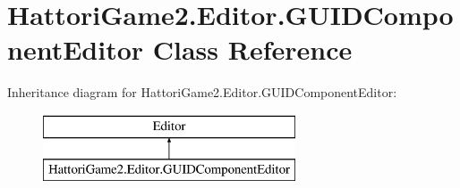 \hypertarget{class_hattori_game2_1_1_editor_1_1_g_u_i_d_component_editor}{}\section{Hattori\+Game2.\+Editor.\+G\+U\+I\+D\+Component\+Editor Class Reference}
\label{class_hattori_game2_1_1_editor_1_1_g_u_i_d_component_editor}
Inheritance diagram for Hattori\+Game2.\+Editor.\+G\+U\+I\+D\+Component\+Editor\+:\begin{figure}[H]
\begin{center}
\leavevmode
\includegraphics[height=2.000000cm]{class_hattori_game2_1_1_editor_1_1_g_u_i_d_component_editor}
\end{center}
\end{figure}
